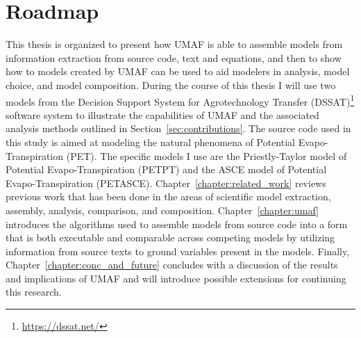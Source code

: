 \section{Roadmap\label{sec:roadmap}}
This thesis is organized to present how UMAF is able to assemble models from information extraction from source code, text and equations, and then to show how to models created by UMAF can be used to aid modelers in analysis, model choice, and model composition.
During the course of this thesis I will use two models from the Decision Support System for Agrotechnology Transfer (DSSAT)\footnote{\url{https://dssat.net/}} software system \citep{DSSAT} to illustrate the capabilities of UMAF and the associated analysis methods outlined in Section~\ref{sec:contributions}.
The source code used in this study is aimed at modeling the natural phenomena of Potential Evapo-Transpiration (PET).
The specific models I use are the Priestly-Taylor model of Potential Evapo-Transpiration (PETPT) and the ASCE model of Potential Evapo-Transpiration (PETASCE).
Chapter~\ref{chapter:related_work} reviews previous work that has been done in the areas of scientific model extraction, assembly, analysis, comparison, and composition.
Chapter~\ref{chapter:umaf} introduces the algorithms used to assemble models from source code into a form that is both executable and comparable across competing models by utilizing information from source texts to ground variables present in the models.
Finally, Chapter~\ref{chapter:conc_and_future} concludes with a discussion of the results and implications of UMAF and will introduce possible extensions for continuing this research.
